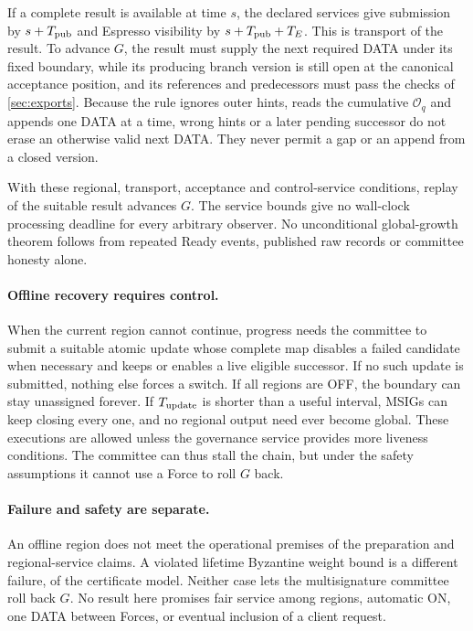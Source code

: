 \documentclass[11pt,a4paper]{article}
\begin{document}
If a complete result is available at time $s$, the declared services give
submission by $s+T_{\rm pub}$ and Espresso visibility by
$s+T_{\rm pub}+T_E$. This is transport of the result. To advance $G$, the
result must supply the next required DATA under its fixed boundary, while
its producing branch version is still open at the canonical acceptance
position, and its references and predecessors must pass the checks of
\cref{sec:exports}. Because the rule ignores outer hints, reads the
cumulative $\mathcal O_q$ and appends one DATA at a time, wrong hints or
a later pending successor do not erase an otherwise valid next DATA. They never permit a gap or an append from a
closed version.

With these regional, transport, acceptance and control-service
conditions, replay of the suitable result advances $G$. The service
bounds give no wall-clock processing deadline for every arbitrary
observer. No unconditional global-growth theorem follows from repeated
Ready events, published raw records or committee honesty alone.

\paragraph{Offline recovery requires control.}
When the current region cannot continue, progress needs the committee to
submit a suitable atomic update whose complete map disables a failed
candidate when necessary and keeps or enables a live eligible successor.
If no such update is
submitted, nothing else forces a switch. If all regions are OFF, the
boundary can stay unassigned forever. If $T_{\rm update}$ is shorter than
a useful interval, MSIGs can keep closing every one, and no regional
output need ever become global. These executions
are allowed unless the governance service provides more liveness
conditions. The committee can thus stall the chain, but under the
safety assumptions it cannot use a Force to roll $G$ back.

\paragraph{Failure and safety are separate.}
An offline region does not meet the operational premises of the
preparation and regional-service claims. A violated lifetime Byzantine
weight bound is a different failure, of the certificate model. Neither
case lets the multisignature committee roll back $G$. No result here
promises fair service among regions, automatic ON, one DATA between
Forces, or eventual inclusion of a client request.
\end{document}
